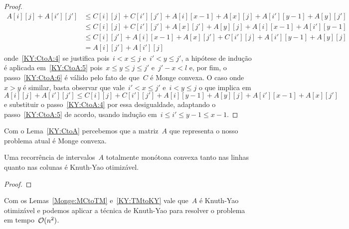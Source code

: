 \begin{proof}
\begin{align}
A[i][j] + A[i'][j'] &\leq C[i][j] + C[i'][j'] + A[i][x-1] + A[x][j] + A[i'][y-1] + A[y][j'] \label{KY:CtoA:4} \\
                    &\leq C[i][j] + C[i'][j'] + A[x][j'] + A[y][j] + A[i][x-1] + A[i'][y-1] \label{KY:CtoA:5} \\
                    &\leq C[i][j'] + A[i][x-1] + A[x][j'] + C[i'][j] + A[i'][y-1] + A[y][j] \label{KY:CtoA:6} \\
                    &= A[i][j'] + A[i'][j] \nonumber
\end{align}
onde~\eqref{KY:CtoA:4} se justifica pois~${i < x \leq j}$ e~${i' < y \leq j'}$, a hipótese de indução é aplicada em~\eqref{KY:CtoA:5} pois~${x \leq y \leq j \leq j'}$ e~${j' - x < l}$ e, por fim, o passo~\eqref{KY:CtoA:6} é válido pelo fato de que~$C$ é Monge convexa. O caso onde~${x > y}$ é similar, basta observar que vale~${i' < x \leq j'}$ e~${i < y \leq j}$ o que implica em~${A[i][j] + A[i'][j'] \leq C[i][j] + C[i'][j'] + A[i][y-1] + A[y][j] + A[i'][x-1] + A[x][j']}$ e substituir o passo~\eqref{KY:CtoA:4} por essa desigualdade, adaptando o passo~\eqref{KY:CtoA:5} de acordo, usando indução em~${i \leq i' \leq y - 1 \leq x - 1}$.
\end{proof}

Com o Lema~\ref{KY:CtoA} percebemos que a matriz~$A$ que representa o nosso problema atual é Monge convexa.

\begin{lema} \label{KY:TMtoKY}
Uma recorrência de intervalos~$A$ totalmente monótona convexa tanto nas linhas quanto nas colunas é Knuth-Yao otimizável.
\end{lema}

\begin{proof}

\end{proof}

Com os Lemas~\ref{Monge:MCtoTM} e~\ref{KY:TMtoKY} vale que~$A$ é Knuth-Yao otimizável e podemos aplicar a técnica de Knuth-Yao para resolver o problema em tempo~$\mathcal{O}(n^2)$.
